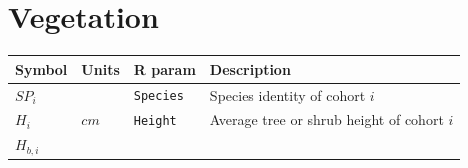 \documentclass[]{book}
\begin{document}
\section{Vegetation}\label{vegetation}

\begin{longtable}[]{@{}llll@{}}
\toprule
\begin{minipage}[b]{0.11\columnwidth}\raggedright\strut
Symbol\strut
\end{minipage} & \begin{minipage}[b]{0.10\columnwidth}\raggedright\strut
Units\strut
\end{minipage} & \begin{minipage}[b]{0.12\columnwidth}\raggedright\strut
R param\strut
\end{minipage} & \begin{minipage}[b]{0.45\columnwidth}\raggedright\strut
Description\strut
\end{minipage}\tabularnewline
\midrule
\endhead
\begin{minipage}[t]{0.11\columnwidth}\raggedright\strut
\(SP_i\)\strut
\end{minipage} & \begin{minipage}[t]{0.10\columnwidth}\raggedright\strut
\strut
\end{minipage} & \begin{minipage}[t]{0.12\columnwidth}\raggedright\strut
\texttt{Species}\strut
\end{minipage} & \begin{minipage}[t]{0.45\columnwidth}\raggedright\strut
Species identity of cohort \(i\)\strut
\end{minipage}\tabularnewline
\begin{minipage}[t]{0.11\columnwidth}\raggedright\strut
\(H_i\)\strut
\end{minipage} & \begin{minipage}[t]{0.10\columnwidth}\raggedright\strut
\(cm\)\strut
\end{minipage} & \begin{minipage}[t]{0.12\columnwidth}\raggedright\strut
\texttt{Height}\strut
\end{minipage} & \begin{minipage}[t]{0.45\columnwidth}\raggedright\strut
Average tree or shrub height of cohort \(i\)\strut
\end{minipage}\tabularnewline
\begin{minipage}[t]{0.11\columnwidth}\raggedright\strut
\(H_{b,i}\)\strut
\end{minipage} & \begin{minipage}[t]{0.10\columnwidth}\raggedright\strut

\end{minipage}
\end{longtable}
\end{document}
